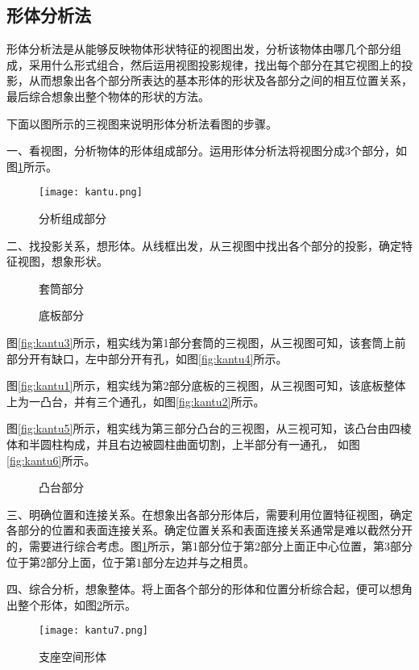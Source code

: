 \subsection{形体分析法}
形体分析法是从能够反映物体形状特征的视图出发，分析该物体由哪几个部分组成，采用什么形式组合，然后运用视图投影规律，找出每个部分在其它视图上的投影，从而想象出各个部分所表达的基本形体的形状及各部分之间的相互位置关系，最后综合想象出整个物体的形状的方法。

下面以图所示的三视图来说明形体分析法看图的步骤。

一、看视图，分析物体的形体组成部分。运用形体分析法将视图分成3个部分，如图\ref{fig:kantu}所示。
\begin{figure}[htbp]
\centering
\texttt{[image: kantu.png]}
\caption{分析组成部分}\label{fig:kantu}
\end{figure}

二、找投影关系，想形体。从线框出发，从三视图中找出各个部分的投影，确定特征视图，想象形状。
\begin{figure}[htbp]
\centering
{}\hspace{30pt}
\caption{套筒部分}
\end{figure}

\begin{figure}[htbp]
\centering
{}\hspace{30pt}
\caption{底板部分}
\end{figure}
图\ref{fig:kantu3}所示，粗实线为第1部分套筒的三视图，从三视图可知，该套筒上前部分开有缺口，左中部分开有孔，如图\ref{fig:kantu4}所示。

图\ref{fig:kantu1}所示，粗实线为第2部分底板的三视图，从三视图可知，该底板整体上为一凸台，并有三个通孔，如图\ref{fig:kantu2}所示。

图\ref{fig:kantu5}所示，粗实线为第三部分凸台的三视图，从三视可知，该凸台由四棱体和半圆柱构成，并且右边被圆柱曲面切割，上半部分有一通孔， 如图\ref{fig:kantu6}所示。

\begin{figure}[htbp]
\centering
{}\hspace{30pt}
\caption{凸台部分}
\end{figure}

三、明确位置和连接关系。在想象出各部分形体后，需要利用位置特征视图，确定各部分的位置和表面连接关系。确定位置关系和表面连接关系通常是难以截然分开的，需要进行综合考虑。图\ref{fig:kantu}所示，第1部分位于第2部分上面正中心位置，第3部分位于第2部分上面，位于第1部分左边并与之相贯。

四、综合分析，想象整体。将上面各个部分的形体和位置分析综合起，便可以想角出整个形体，如图\ref{fig:kantu7}所示。
\begin{figure}[htbp]
\centering
\texttt{[image: kantu7.png]}
\caption{支座空间形体}\label{fig:kantu7}
\end{figure}
\endinput